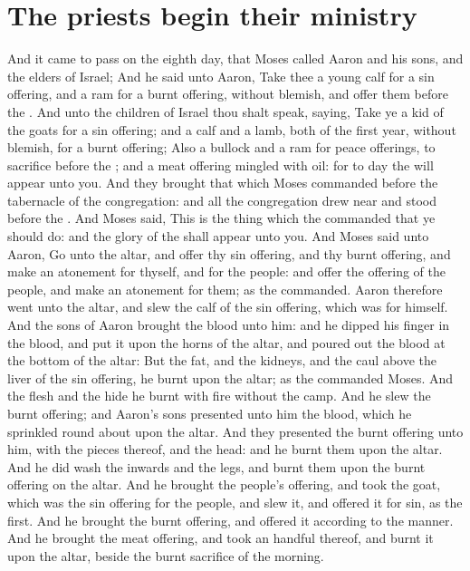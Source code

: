 \section*{The priests begin their ministry}
\begin{biblechapter} %
\verse And it came to pass on the eighth day, that Moses called Aaron and his sons, and the elders of Israel;
\verse And he said unto Aaron, Take thee a young calf for a sin offering, and a ram for a burnt offering, without blemish, and offer them before the \LORD.
\verse And unto the children of Israel thou shalt speak, saying, Take ye a kid of the goats for a sin offering; and a calf and a lamb, both of the first year, without blemish, for a burnt offering;
\verse Also a bullock and a ram for peace offerings, to sacrifice before the \LORD; and a meat offering mingled with oil: for to day the \LORD will appear unto you.
\verse And they brought that which Moses commanded before the tabernacle of the congregation: and all the congregation drew near and stood before the \LORD.
\verse And Moses said, This is the thing which the \LORD commanded that ye should do: and the glory of the \LORD shall appear unto you.
\verse And Moses said unto Aaron, Go unto the altar, and offer thy sin offering, and thy burnt offering, and make an atonement for thyself, and for the people: and offer the offering of the people, and make an atonement for them; as the \LORD commanded.
\verse Aaron therefore went unto the altar, and slew the calf of the sin offering, which was for himself.
\verse And the sons of Aaron brought the blood unto him: and he dipped his finger in the blood, and put it upon the horns of the altar, and poured out the blood at the bottom of the altar:
\verse But the fat, and the kidneys, and the caul above the liver of the sin offering, he burnt upon the altar; as the \LORD commanded Moses.
\verse And the flesh and the hide he burnt with fire without the camp.
\verse And he slew the burnt offering; and Aaron's sons presented unto him the blood, which he sprinkled round about upon the altar.
\verse And they presented the burnt offering unto him, with the pieces thereof, and the head: and he burnt them upon the altar.
\verse And he did wash the inwards and the legs, and burnt them upon the burnt offering on the altar.
\verse And he brought the people's offering, and took the goat, which was the sin offering for the people, and slew it, and offered it for sin, as the first.
\verse And he brought the burnt offering, and offered it according to the manner.
\verse And he brought the meat offering, and took an handful thereof, and burnt it upon the altar, beside the burnt sacrifice of the morning.

\end{biblechapter}
